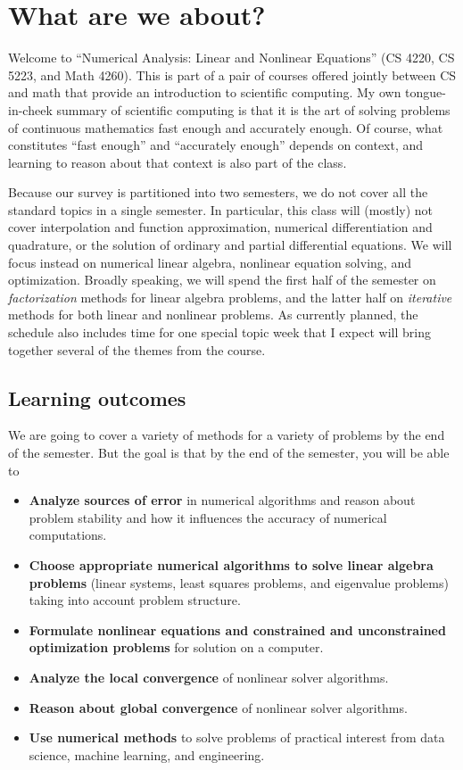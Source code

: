 \documentclass[12pt, leqno]{article}
\begin{document}

\section{What are we about?}

Welcome to ``Numerical Analysis: Linear and Nonlinear Equations'' (CS
4220, CS 5223, and Math 4260).  This is part of a pair of courses
offered jointly between CS and math that provide an introduction to
scientific computing.  My own tongue-in-cheek summary of scientific
computing is that it is the art of solving problems of continuous
mathematics fast enough and accurately enough.  Of course, what
constitutes ``fast enough'' and ``accurately enough'' depends on
context, and learning to reason about that context is also part of the
class.

Because our survey is partitioned into two semesters, we do not cover
all the standard topics in a single semester.  In particular, this class
will (mostly) not cover interpolation and function approximation,
numerical differentiation and quadrature, or the solution of ordinary
and partial differential equations.  We will focus instead on numerical
linear algebra, nonlinear equation solving, and optimization.  Broadly
speaking, we will spend the first half of the semester on {\em
factorization} methods for linear algebra problems, and the latter half
on {\em iterative} methods for both linear and nonlinear problems.  As
currently planned, the schedule also includes time for one special topic
week that I expect will bring together several of the themes from the
course.

\subsection{Learning outcomes}

We are going to cover a variety of methods for a variety of problems
by the end of the semester.  But the goal is that by the end of the
semester, you will be able to
\begin{itemize}
\item {\bf Analyze sources of error} in numerical algorithms and reason about
  problem stability and how it influences the accuracy of numerical
  computations.
\item {\bf Choose appropriate numerical algorithms to solve linear
  algebra problems} (linear systems, least squares problems, and
  eigenvalue problems) taking into account problem structure.
\item {\bf Formulate nonlinear equations and constrained and
  unconstrained optimization problems} for solution on a computer.
\item {\bf Analyze the local convergence} of nonlinear solver
  algorithms.
\item {\bf Reason about global convergence} of nonlinear solver
  algorithms.
\item {\bf Use numerical methods} to solve problems of practical
  interest from data science, machine learning, and engineering.
\end{itemize}
\end{document}

